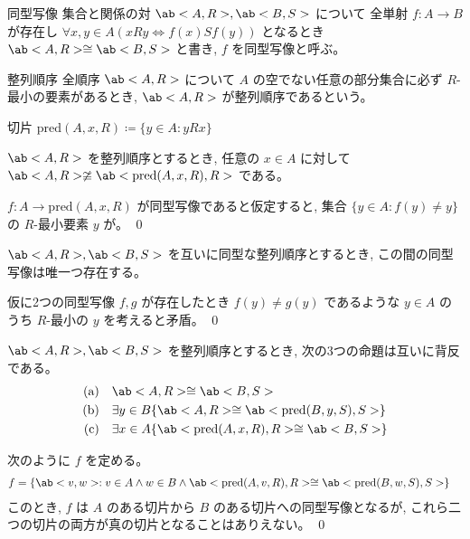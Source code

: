 \documentclass[uplatex,dvipdfmx,a4paper,11pt]{jlreq}
\makeatletter
\theoremstyle{definition}
\renewenvironment{proof}[1][\proofname]{\par
  \normalfont
  \topsep6\p@\@plus6\p@ \trivlist
  \item[\hskip\labelsep{\bfseries #1}\@addpunct{\bfseries}]\ignorespaces\quad\par
}{%
  \qed\endtrivlist\@endpefalse
}
\renewcommand\proofname{証明}
\makeatother
\begin{document}
\begin{definition}
  同型写像
  集合と関係の対 $\ab<A, R>, \ab<B, S>$ について
  全単射 $f:A\to B$ が存在し $\forall x,y\in A(xRy\iff f(x)Sf(y))$ となるとき $\ab<A,R>\cong\ab<B,S>$ と書き, $f$ を同型写像と呼ぶ。

  整列順序
  全順序 $\ab<A,R>$ について $A$ の空でない任意の部分集合に必ず $R$-最小の要素があるとき, $\ab<A,R>$ が整列順序であるという。

  切片
  $\mathrm{pred}(A,x,R)\coloneq\{y\in A:yRx\}$
\end{definition}

\begin{theorem}
  $\ab<A,R>$ を整列順序とするとき, 任意の $x\in A$ に対して $\ab<A,R>\ncong\ab<\mathrm{pred}(A,x,R), R>$ である。
\end{theorem}
\begin{proof}
  $f:A\to\mathrm{pred}(A,x,R)$ が同型写像であると仮定すると, 集合 $\{y\in A:f(y)\neq y\}$ の $R$-最小要素 $y$ が。
\end{proof}

\begin{theorem}
  $\ab<A,R>, \ab<B,S>$ を互いに同型な整列順序とするとき, この間の同型写像は唯一つ存在する。
\end{theorem}
\begin{proof}
  仮に2つの同型写像 $f, g$ が存在したとき $f(y)\neq g(y)$ であるような $y\in A$ のうち $R$-最小の $y$ を考えると矛盾。
\end{proof}

\begin{theorem}
  $\ab<A,R>, \ab<B,S>$ を整列順序とするとき, 次の3つの命題は互いに背反である。
  \begin{align}
    \text{(a)}\quad & \ab<A,R>\cong\ab<B,S>                                      \\
    \text{(b)}\quad & \exists y\in B\{\ab<A,R>\cong\ab<\mathrm{pred}(B,y,S),S>\} \\
    \text{(c)}\quad & \exists x\in A\{\ab<\mathrm{pred}(A,x,R),R>\cong\ab<B,S>\}
  \end{align}
\end{theorem}
\begin{proof}
  次のように $f$ を定める。
  \begin{align}
    f & = \{\ab<v, w>: v\in A\land w\in B\land\ab<\mathrm{pred}(A,v,R), R>\cong\ab<\mathrm{pred}(B,w,S),S>\}
  \end{align}
  このとき, $f$ は $A$ のある切片から $B$ のある切片への同型写像となるが, これら二つの切片の両方が真の切片となることはありえない。
\end{proof}
\end{document}

